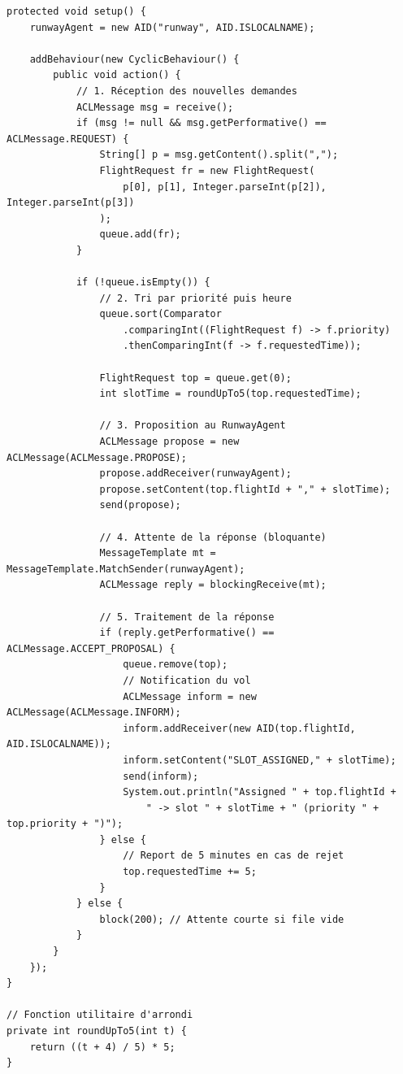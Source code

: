 \documentclass[12pt,a4paper]{article}
\begin{document}
\begin{lstlisting}[caption=ControllerAgent.java - Logique de tri et d'attribution]
protected void setup() {
    runwayAgent = new AID("runway", AID.ISLOCALNAME);

    addBehaviour(new CyclicBehaviour() {
        public void action() {
            // 1. Réception des nouvelles demandes
            ACLMessage msg = receive();
            if (msg != null && msg.getPerformative() == ACLMessage.REQUEST) {
                String[] p = msg.getContent().split(",");
                FlightRequest fr = new FlightRequest(
                    p[0], p[1], Integer.parseInt(p[2]), Integer.parseInt(p[3])
                );
                queue.add(fr);
            }

            if (!queue.isEmpty()) {
                // 2. Tri par priorité puis heure
                queue.sort(Comparator
                    .comparingInt((FlightRequest f) -> f.priority)
                    .thenComparingInt(f -> f.requestedTime));

                FlightRequest top = queue.get(0);
                int slotTime = roundUpTo5(top.requestedTime);

                // 3. Proposition au RunwayAgent
                ACLMessage propose = new ACLMessage(ACLMessage.PROPOSE);
                propose.addReceiver(runwayAgent);
                propose.setContent(top.flightId + "," + slotTime);
                send(propose);

                // 4. Attente de la réponse (bloquante)
                MessageTemplate mt = MessageTemplate.MatchSender(runwayAgent);
                ACLMessage reply = blockingReceive(mt);

                // 5. Traitement de la réponse
                if (reply.getPerformative() == ACLMessage.ACCEPT_PROPOSAL) {
                    queue.remove(top);
                    // Notification du vol
                    ACLMessage inform = new ACLMessage(ACLMessage.INFORM);
                    inform.addReceiver(new AID(top.flightId, AID.ISLOCALNAME));
                    inform.setContent("SLOT_ASSIGNED," + slotTime);
                    send(inform);
                    System.out.println("Assigned " + top.flightId +
                        " -> slot " + slotTime + " (priority " + top.priority + ")");
                } else {
                    // Report de 5 minutes en cas de rejet
                    top.requestedTime += 5;
                }
            } else {
                block(200); // Attente courte si file vide
            }
        }
    });
}

// Fonction utilitaire d'arrondi
private int roundUpTo5(int t) {
    return ((t + 4) / 5) * 5;
}
\end{lstlisting}
\end{document}
